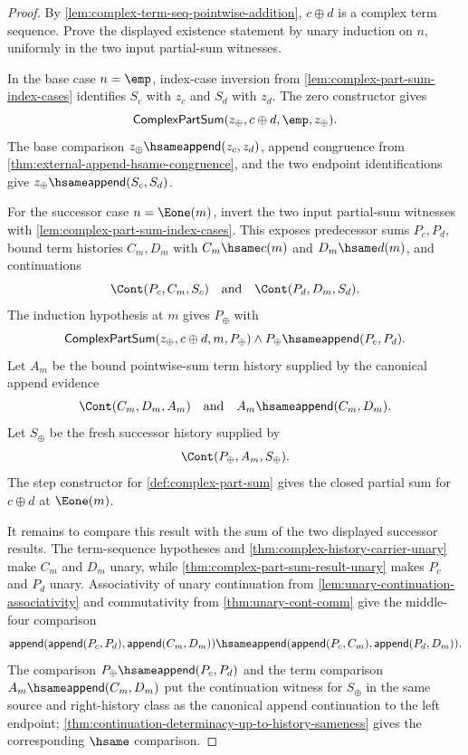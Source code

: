 \begin{proof}
By \autoref{lem:complex-term-seq-pointwise-addition}, $c\oplus d$ is a complex term sequence. Prove the displayed existence statement by unary induction on $n$, uniformly in the two input partial-sum witnesses.

In the base case $n=\emp$, index-case inversion from \autoref{lem:complex-part-sum-index-cases} identifies $S_c$ with $z_c$ and $S_d$ with $z_d$. The zero constructor gives
$$
\mathsf{ComplexPartSum}(z_\oplus,c\oplus d,\emp,z_\oplus).
$$
The base comparison $z_\oplus\hsame\mathsf{append}(z_c,z_d)$, append congruence from \autoref{thm:external-append-hsame-congruence}, and the two endpoint identifications give $z_\oplus\hsame\mathsf{append}(S_c,S_d)$.

For the successor case $n=\Eone(m)$, invert the two input partial-sum witnesses with \autoref{lem:complex-part-sum-index-cases}. This exposes predecessor sums $P_c,P_d$, bound term histories $C_m,D_m$ with $C_m\hsame c(m)$ and $D_m\hsame d(m)$, and continuations
$$
\Cont(P_c,C_m,S_c)
\quad\text{and}\quad
\Cont(P_d,D_m,S_d).
$$
The induction hypothesis at $m$ gives $P_\oplus$ with
$$
\mathsf{ComplexPartSum}(z_\oplus,c\oplus d,m,P_\oplus)
\land
P_\oplus\hsame\mathsf{append}(P_c,P_d).
$$
Let $A_m$ be the bound pointwise-sum term history supplied by the canonical append evidence
$$
\Cont(C_m,D_m,A_m)
\quad\text{and}\quad
A_m\hsame\mathsf{append}(C_m,D_m).
$$
Let $S_\oplus$ be the fresh successor history supplied by
$$
\Cont(P_\oplus,A_m,S_\oplus).
$$
The step constructor for \autoref{def:complex-part-sum} gives the closed partial sum for $c\oplus d$ at $\Eone(m)$.

It remains to compare this result with the sum of the two displayed successor results. The term-sequence hypotheses and \autoref{thm:complex-history-carrier-unary} make $C_m$ and $D_m$ unary, while \autoref{thm:complex-part-sum-result-unary} makes $P_c$ and $P_d$ unary. Associativity of unary continuation from \autoref{lem:unary-continuation-associativity} and commutativity from \autoref{thm:unary-cont-comm} give the middle-four comparison
$$
\mathsf{append}(\mathsf{append}(P_c,P_d),\mathsf{append}(C_m,D_m))
\hsame
\mathsf{append}(\mathsf{append}(P_c,C_m),\mathsf{append}(P_d,D_m)).
$$
The comparison $P_\oplus\hsame\mathsf{append}(P_c,P_d)$ and the term comparison $A_m\hsame\mathsf{append}(C_m,D_m)$ put the continuation witness for $S_\oplus$ in the same source and right-history class as the canonical append continuation to the left endpoint; \autoref{thm:continuation-determinacy-up-to-history-sameness} gives the corresponding $\hsame$ comparison.


\end{proof}
